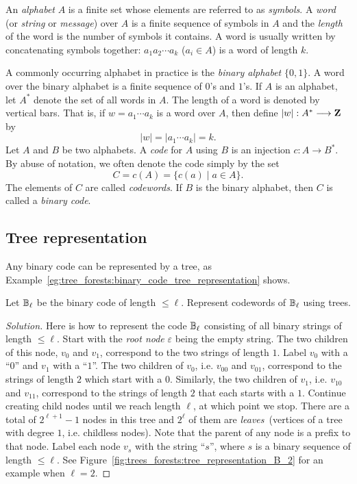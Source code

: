 An \emph{alphabet} $A$ is a finite set whose elements
are referred to as \emph{symbols}. A \emph{word} (or
\emph{string} or \emph{message}) over $A$
is a finite sequence of symbols in $A$ and the \emph{length} of the
word is the number of symbols it contains. A word is usually written
by concatenating symbols together: $a_1 a_2 \cdots a_k$ ($a_i \in A$)
is a word of length $k$.

A commonly occurring alphabet in practice is the \emph{binary alphabet}
$\{0,1\}$. A word over the binary alphabet is a finite sequence of
$0$'s and $1$'s. If $A$ is an alphabet, let $A^*$ denote the set of
all words in $A$. The length of a word is denoted by vertical
bars. That is, if $w = a_1 \cdots a_k$ is a word over $A$, then define
$|w|: A^* \longrightarrow \mathbf{Z}$ by
\[
|w|
=
|a_1 \cdots a_k|
=
k.
\]
Let $A$ and $B$ be two alphabets. A \emph{code} for $A$
using $B$ is an injection $c: A \to B^*$. By abuse of
notation, we often denote the code simply by the set
\[
C
=
c(A)
=
\{c(a) \;|\; a \in A\}.
\]
The elements of $C$ are called \emph{codewords}. If
$B$ is the binary alphabet, then $C$ is called a
\emph{binary code}.



\subsection{Tree representation}

Any binary code can be represented by a tree, as
Example~\ref{eg:tree_forests:binary_code_tree_representation} shows.

\begin{example}
\label{eg:tree_forests:binary_code_tree_representation}
Let $\mathbb{B}_\ell$ be the binary code of length $\leq \ell$. Represent
codewords of $\mathbb{B}_\ell$ using trees.
\end{example}

\begin{proof}[Solution]
Here is how to represent the code $\mathbb{B}_\ell$ consisting of all binary
strings of length $\leq \ell$. Start with the
\emph{root node} $\varepsilon$\index{$\varepsilon$}
being the empty string. The two children of this node, $v_0$ and
$v_1$, correspond to the two strings of length $1$. Label $v_0$ with a
``$0$'' and $v_1$ with a ``$1$''. The two children of $v_0$,
i.e. $v_{00}$ and $v_{01}$, correspond to the strings of length $2$
which start with a $0$. Similarly, the  two children of $v_1$,
i.e. $v_{10}$ and $v_{11}$, correspond to the strings of length $2$
that each starts with a $1$. Continue creating child nodes until we
reach length $\ell$, at which point we stop. There are a total of
$2^{\ell + 1} - 1$ nodes in this tree and $2^\ell$ of them are
\emph{leaves}~(vertices of a tree with degree $1$,
i.e. childless nodes). Note that the parent of any node is a prefix to
that node. Label each node $v_s$ with the string ``$s$'', where $s$ is
a binary sequence of length $\leq \ell$. See
Figure~\ref{fig:trees_forests:tree_representation_B_2} for an example
when $\ell = 2$.
\end{proof}

